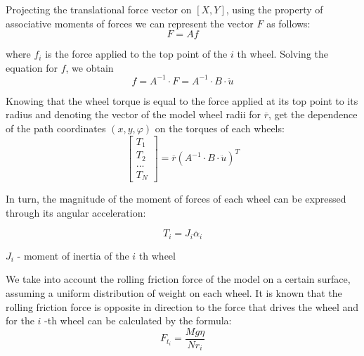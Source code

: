 \documentclass[oneside,final,14pt]{extreport}
\begin{document}
Projecting the translational force vector on $ [X, Y] $, using the property of associative moments of forces
we can represent the vector $ F $ as follows:
\begin{equation}
\label{Force}
F = Af
\end{equation}

where $ f_{i} $ is the force applied to the top point of the $ i $ th wheel.
Solving the equation  for $ f $, we obtain
\begin{equation}
f
=
A^{-1}
\cdot
F
=
A^{-1}
\cdot
B 
\cdot
\ddot{u}
\end{equation}

Knowing that the wheel torque is equal to the force applied at its top point to its radius and denoting the vector of the model wheel radii for $ \overline {r} $, get the dependence of the path coordinates $ (x, y, \varphi) $ on the torques of each wheels:
\begin{equation}
\begin{bmatrix}
T_{1} \\
T_{2} \\
... \\
T_{N}
\end{bmatrix}
=
\overline{r}
(
A^{-1}
\cdot
B 
\cdot
\ddot{u}
)^{T}
\end{equation}

In turn, the magnitude of the moment of forces of each wheel can be expressed through its angular acceleration:

\begin{equation}
T_{i}
=
J_{i}\ddot{\alpha_{i}}
\end{equation}

$J_{i}$ - moment of inertia of the $ i $ th wheel

We take into account the rolling friction force of the model on a certain surface, assuming a uniform distribution of weight on each wheel. It is known that the rolling friction force is opposite in direction to the force that drives the wheel and for the $ i $ -th wheel can be calculated by the formula:
\begin{equation}
F_{t_{i}}
=
\frac{Mg\eta}{Nr_{i}}
\end{equation}
\end{document}
